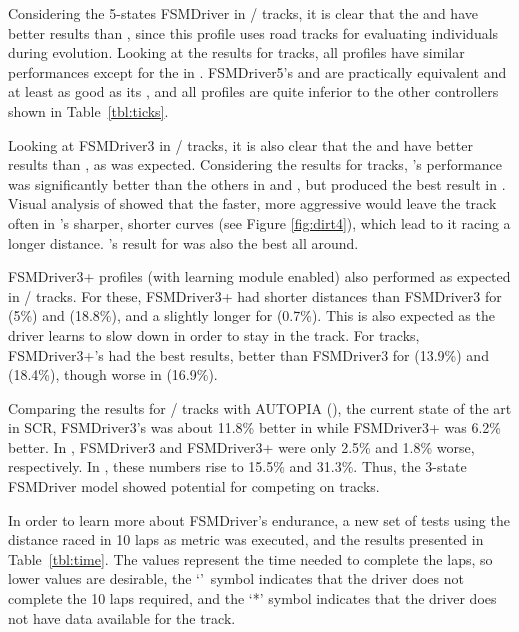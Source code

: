 Considering the 5-states FSMDriver in / tracks, it is clear that the  and  have better results than , since this profile uses road tracks for evaluating individuals during evolution. Looking at the results for  tracks, all profiles have similar performances except for the  in . %
FSMDriver5's  and  are practically equivalent and at least as good as its , and all profiles are quite inferior to the other controllers shown in Table~\ref{tbl:ticks}.

Looking at FSMDriver3 in / tracks, it is also clear that the  and  have better results than , as was expected. Considering the results for  tracks, 's performance was significantly better than the others in  and , but  produced the best result in . Visual analysis of showed that the faster, more aggressive  would leave the track often in 's sharper, shorter curves (see Figure \ref{fig:dirt4}), which lead to it racing a longer distance. 's result for  was also the best all around.

FSMDriver3+ profiles (with learning module enabled) also performed as expected in / tracks. For these, FSMDriver3+ had shorter distances than FSMDriver3 for  (5\%) and  (18.8\%), and a slightly longer for  (0.7\%). This is also expected as the driver learns to slow down in order to stay in the track. For  tracks, FSMDriver3+'s  had the best results, better than FSMDriver3 for  (13.9\%) and  (18.4\%), though worse in  (16.9\%).

Comparing the results for / tracks with AUTOPIA (\cite{AUTOPIA2009}), the current state of the art in SCR, FSMDriver3's  was about 11.8\% better in  while FSMDriver3+ was 6.2\% better. In , FSMDriver3 and FSMDriver3+ were only 2.5\% and 1.8\% worse, respectively. In , these numbers rise to 15.5\% and 31.3\%. Thus, the 3-state FSMDriver model showed potential for competing on  tracks.

In order to learn more about FSMDriver's endurance, a new set of tests using the distance raced in 10 laps as metric was executed, and the results presented in Table~\ref{tbl:time}. The values represent the time needed to complete the laps, so lower values are desirable, the `\textdagger'~symbol indicates that the driver does not complete the 10 laps required, and the `*' symbol indicates that the driver does not have data available for the track.

